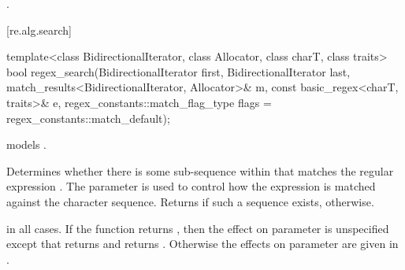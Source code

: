 \begin{itemdescr}
\pnum
\returns
{}.
\end{itemdescr}

[re.alg.search]{}

%
\begin{itemdecl}
template<class BidirectionalIterator, class Allocator, class charT, class traits>
  bool regex_search(BidirectionalIterator first, BidirectionalIterator last,
                    match_results<BidirectionalIterator, Allocator>& m,
                    const basic_regex<charT, traits>& e,
                    regex_constants::match_flag_type flags = regex_constants::match_default);
\end{itemdecl}

\begin{itemdescr}
\pnum
\expects
{} models
.

\pnum
\effects
Determines whether there is some sub-sequence within  that matches
the regular expression . The parameter  is used to control how the
expression is matched against the character sequence. Returns  if such a sequence
exists,  otherwise.

\pnum
\ensures
{} in all cases.
If the function returns , then the effect
on parameter  is unspecified except that 
returns  and  returns .  Otherwise
the effects on parameter  are given in .
\end{itemdescr}

